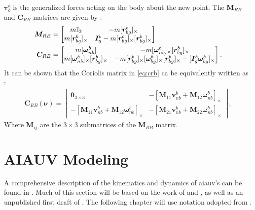 $\bm{\tau}_{b}^b$ is the generalized forces acting on the body about the new
point. The $\bm{M}_{RB}$ and $\bm{C}_{RB}$ matrices are given by \cite{fossen2021}:
\begin{subequations}
\begin{align}
    \bm{M}_{RB} &= \begin{bmatrix}
        m \mathbb{I}_3 & - m [\bm{r}_{bg}^b]_{\times} \\
        m [\bm{r}_{bg}^b]_{\times} & \bm{I}_g^b - m [\bm{r}_{bg}^b]_{\times}[\bm{r}_{bg}^b]_{\times}
    \end{bmatrix} \\
    \bm{C}_{RB} &= \begin{bmatrix}
        m [\bm{\omega}_{nb}^b] & -m [\bm{\omega}_{nb}^b]_{\times}[\bm{r}_{bg}^b]_{\times} \\
        m [\bm{\omega}_{nb}^b]_{\times}[\bm{r}_{bg}^b]_{\times} & 
        -m [ \bm{r}_{bg}^b ]_{\times} [ \bm{\omega}_{bg}^b ]_{\times} [ \bm{r}_{bg}^b ]_{\times} -
        [ \bm{I}_g^b \bm{\omega}_{bg}^b ]_{\times}
    \end{bmatrix}. \label{eq:crb}
\end{align}
\end{subequations}
It can be shown that the Coriolis matrix in \autoref{eq:crb} ca be equivalently
written as \cite{sagatun1991}:
\begin{align}
    \bm{C}_{RB}(\bm\nu) = \begin{bmatrix}
        \bm{0}_{3 \times 3} & 
        -\left[\bm{M}_{11}\bm{v}_{nb}^{b} + \bm{M}_{12}\bm{\omega}_{nb}^b \right]_{\times} \\
        -\left[\bm{M}_{11}\bm{v}_{nb}^{b} + \bm{M}_{12}\bm{\omega}_{nb}^b \right]_{\times} &
        -\left[\bm{M}_{21}\bm{v}_{nb}^{b} + \bm{M}_{22}\bm{\omega}_{nb}^b \right]_{\times}
    \end{bmatrix},
\end{align}
Where $\bm{M}_{ij}$ are the $3 \times 3$ submatrices of the $\bm{M}_{RB}$ matrix.

\newpage
\section{AIAUV Modeling}

A comprehensive description of the kinematics and dynamics of
\gls{aiauv}'s can be found in \cite{schmidt2018}. Much of this section
will be based on the work of \cite{from2014} and \cite{schmidt2018}, as well as an unpublished
first draft of \cite{schmidt2018}. The following chapter will use notation adopted from
\cite{from2014}.

